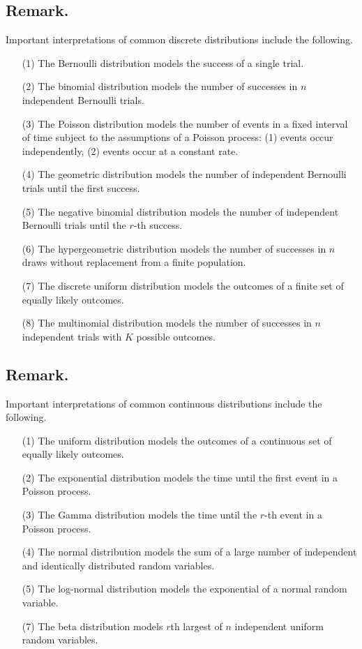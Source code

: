 \documentclass[titlepage]{article}
\begin{document}
\subsection{Remark.} Important interpretations of common discrete distributions include the following.
\begin{enumerate}
\item[(1)] The Bernoulli distribution models the success of a single trial.
\item[(2)] The binomial distribution models the number of successes in $n$ independent Bernoulli trials.
\item[(3)] The Poisson distribution models the number of events in a fixed interval of time subject to the assumptions of a Poisson process: (1) events occur independently, (2) events occur at a constant rate.
\item[(4)] The geometric distribution models the number of independent Bernoulli trials until the first success.
\item[(5)] The negative binomial distribution models the number of independent Bernoulli trials until the $r$-th success.
\item[(6)] The hypergeometric distribution models the number of successes in $n$ draws without replacement from a finite population.
\item[(7)] The discrete uniform distribution models the outcomes of a finite set of equally likely outcomes.
\item[(8)] The multinomial distribution models the number of successes in $n$ independent trials with $K$ possible outcomes.
\end{enumerate}

\subsection{Remark.} Important interpretations of common continuous distributions include the following.
\begin{enumerate}
\item[(1)] The uniform distribution models the outcomes of a continuous set of equally likely outcomes.
\item[(2)] The exponential distribution models the time until the first event in a Poisson process.
\item[(3)] The Gamma distribution models the time until the $r$-th event in a Poisson process.
\item[(4)] The normal distribution models the sum of a large number of independent and identically distributed random variables.
\item[(5)] The log-normal distribution models the exponential of a normal random variable.
\item[(7)] The beta distribution models $r$th largest of $n$ independent uniform random variables.
\end{enumerate}
\end{document}

